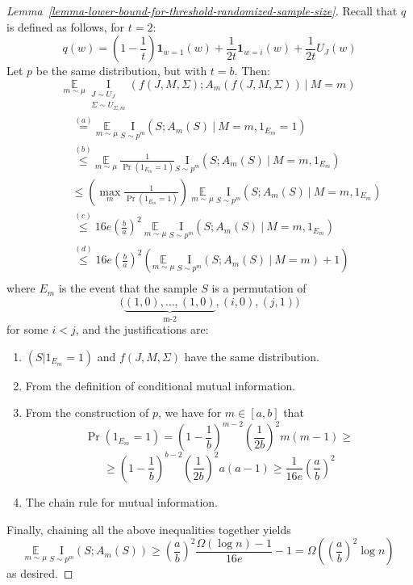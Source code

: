 \documentclass[final,12pt]{colt2018}
\newcommand{\EE}[1]{\underset{#1}{\mathbb{E}}}
\newcommand{\I}[2]{\underset{#1}{\mathrm{I}}\left(#2\right)}
\begin{document}
\begin{proof}[Lemma~\ref{lemma-lower-bound-for-threshold-randomized-sample-size}]
	Recall that $q$ is defined as follows, for $t=2$: 
	\[
	q(w) = \left(1-\frac{1}{t}\right)\textbf{1}_{w=1}(w) + \frac{1}{2t}\textbf{1}_{w=i}(w) + \frac{1}{2t} U_J(w)
	\]
	Let $p$ be the same distribution, but with $t=b$. Then:
	\[
	\EE{m \sim \mu} \: \I{\substack{J \sim U_J \\ \Sigma \sim U_{\Sigma,m}}}{f(J,M,\Sigma);A_m(f(J,M,\Sigma)) \: | \: M=m} 
	\]
	\begin{align*}
	\:\:\:\:\:\:\:\:\:\: & \stackrel{(a)}{=} \EE{m \sim \mu} \: \I{S \sim p^m}{S;A_m(S) \: | \: M=m, 1_{E_m}=1} \\
	& \stackrel{(b)}{\leq} \EE{m \sim \mu} \: \frac{1}{\Pr(1_{E_m}=1)} \I{S \sim p^m}{S;A_m(S) \: | \: M=m,1_{E_m}} \\
	& \leq \left(\max_{m}\frac{1}{\Pr(1_{E_m}=1)}\right) \:\EE{m \sim \mu} \: \I{S \sim p^m}{S;A_m(S) \: | \: M=m,1_{E_m}} \\
	& \stackrel{(c)}{\leq} 16e \left(\frac{b}{a}\right)^2 \:\EE{m \sim \mu} \: \I{S \sim p^m}{S;A_m(S) \: | \: M=m,1_{E_m}} \\
	& \stackrel{(d)}{\leq} 16e \left(\frac{b}{a}\right)^2 \left(\EE{m \sim \mu} \: \I{S \sim p^m}{S;A_m(S) \: | \: M=m} + 1\right) \\
	\end{align*}
	where $E_m$ is the event that the sample $S$ is a permutation of
	\[
	\Big(\underbrace{(1,0), \dots, (1,0)}_{\text{ m-2 }}, (i,0), (j,1) \Big)
	\]
	for some $i<j$, and the justifications are:
	\begin{enumerate}[label=(\alph*)]
		\item{$(S|1_{E_m}=1)$ and $f(J,M,\Sigma)$ have the same distribution.}
		\item{From the definition of conditional mutual information.}
		\item{
			From the construction of $p$, we have for $m\in[a,b]$ that
			\[
			\Pr(1_{E_m}=1) = \left(1-\frac{1}{b}\right)^{m-2}\left(\frac{1}{2b}\right)^2m(m-1) \geq
			\]
			\[
			\geq \left(1-\frac{1}{b}\right)^{b-2}\left(\frac{1}{2b}\right)^2a(a-1)\geq \frac{1}{16e} \left(\frac{a}{b}\right)^2
			\]
		}
		\item{The chain rule for mutual information.}
	\end{enumerate}
	
	 Finally, chaining all the above inequalities together yields
	\[
	\EE{m \sim \mu} \: \I{S \sim p^m}{S;A_m(S)} \geq \left(\frac{a}{b}\right)^2 \frac{\Omega(\log n) - 1}{16e} - 1 = \Omega\left(\left(\frac{a}{b}\right)^2 \log n\right)
	\]
	as desired.
\end{proof}
\end{document}
